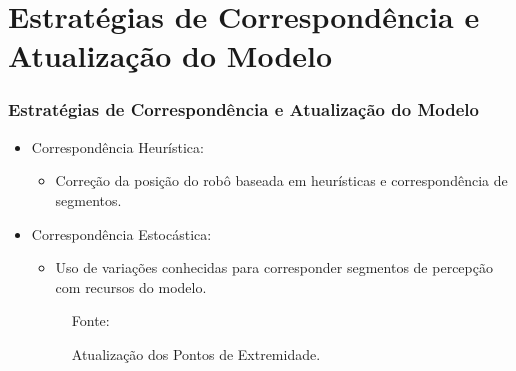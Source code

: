 \documentclass[xcolor=dvipsnames, aspectratio=169]{beamer}
\begin{document}
\section{Estratégias de Correspondência e Atualização do Modelo}
  \begin{frame}
  \frametitle{Estratégias de Correspondência e Atualização do Modelo}
  \begin{itemize}
      \item Correspondência Heurística: 
      \begin{itemize}
        \item Correção da posição do robô baseada em heurísticas e correspondência de segmentos.
      \end{itemize}
      \item Correspondência Estocástica:
      \begin{itemize}
        \item  Uso de variações conhecidas para corresponder segmentos de percepção com recursos do modelo.
      \end{itemize}

      \begin{figure}
        \centering
        {Fonte: \cite{buniyamin2011simple}}
        \caption{Atualização dos Pontos de Extremidade.}
        \label{fig:5}
      \end{figure}


\end{itemize}
\end{frame}
\end{document}
